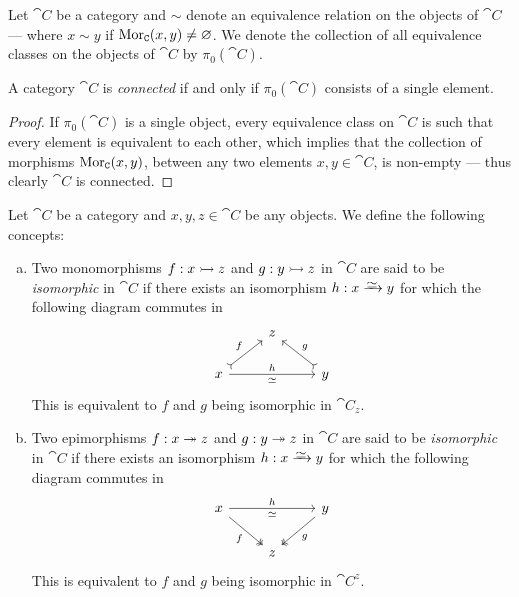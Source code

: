 \begin{definition}
    \label{def:equivalence-class-category}
    Let \(\cat C\) be a category and \(\sim\) denote an equivalence relation on the
    objects of \(\cat C\) --- where \(x \sim y\) if \(\operatorname{Mor}_{\texttt C}(x, y) \neq
    \varnothing\). We denote the collection of all equivalence classes on the objects
    of \(\cat C\) by \(\pi_0(\cat C)\).
\end{definition}

\begin{corollary}
    \label{cor:connected-iff-class-point}
    A category \(\cat C\) is \emph{connected} if and only if \(\pi_0(\cat C)\)
    consists of a single element.
\end{corollary}

\begin{proof}
    If \(\pi_0(\cat C)\) is a single object, every equivalence class on \(\cat C\)
    is such that every element is equivalent to each other, which implies that the
    collection of morphisms \(\operatorname{Mor}_{\texttt C}(x, y)\), between any two elements \(x, y
    \in \cat C\), is non-empty --- thus clearly \(\cat C\) is connected.
\end{proof}

\begin{definition}
    \label{def:iso-mono-epi}
    Let \(\cat C\) be a category and \(x, y, z \in \cat C\) be any objects. We
    define the following concepts:
    \begin{enumerate}[(a)]\setlength\itemsep{0em}
        \item Two monomorphisms \(f: x \rightarrowtail z\) and \(g: y \rightarrowtail z\) in \(\cat C\) are
              said to be \emph{isomorphic} in \(\cat C\) if there exists an isomorphism \(h:
              x \isoto y\) for which the following diagram commutes in
              \[
                  \begin{tikzcd}
                      &z & \\
                      x \ar[rr, "h", "\iso"'] \ar[ur, tail, "f"] &
                      &y \ar[ul, tail, swap, "g"]
                  \end{tikzcd}
              \]
              This is equivalent to \(f\) and \(g\) being isomorphic in \(\cat C_z\).
        \item Two epimorphisms \(f: x \twoheadrightarrow z\) and \(g: y \twoheadrightarrow z\) in \(\cat C\) are
              said to be \emph{isomorphic} in \(\cat C\) if there exists an isomorphism \(h:
              x \isoto y\) for which the following diagram commutes in
              \[
                  \begin{tikzcd}
                      x \ar[rr, "h", "\iso"'] \ar[dr, two heads, swap, "f"] &
                      &y \ar[dl, two heads, "g"] \\
                      &z &
                  \end{tikzcd}
              \]
              This is equivalent to \(f\) and \(g\) being isomorphic in \(\cat C^z\).
    \end{enumerate}
\end{definition}

